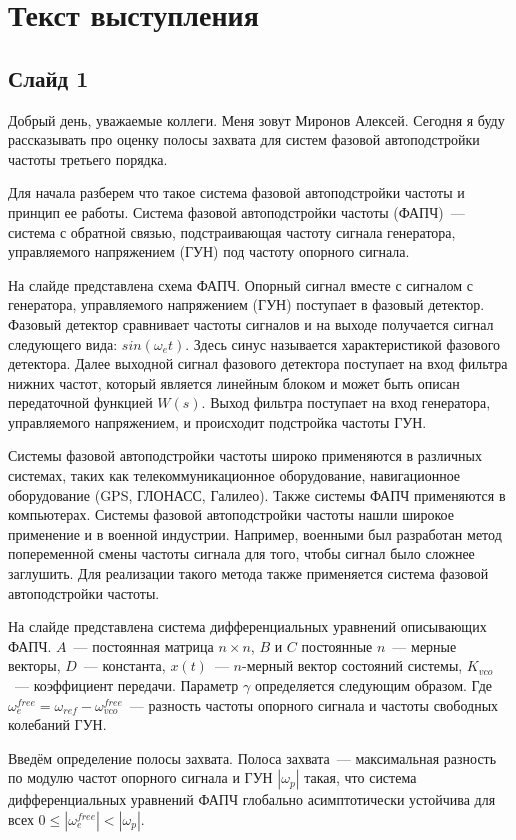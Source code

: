 \documentclass[a4paper,article,14pt]{extarticle}
\begin{document}
\section*{Текст выступления}
\subsection*{Слайд 1}
  Добрый день, уважаемые коллеги. Меня зовут Миронов Алексей. Сегодня я буду рассказывать про оценку полосы захвата для систем фазовой автоподстройки частоты третьего порядка. 

  Для начала разберем что такое система фазовой автоподстройки частоты и принцип ее работы. Система фазовой автоподстройки частоты (ФАПЧ)~--- система с обратной связью, подстраивающая частоту сигнала генератора, управляемого напряжением (ГУН) под частоту опорного сигнала.
  
На слайде представлена схема ФАПЧ. Опорный сигнал вместе с сигналом с генератора, управляемого напряжением (ГУН) поступает в фазовый детектор. Фазовый детектор сравнивает частоты сигналов и на выходе получается сигнал следующего вида: $sin(\omega_e t)$. Здесь синус называется характеристикой фазового детектора. Далее выходной сигнал фазового детектора поступает на вход фильтра нижних частот, который является линейным блоком и может быть описан передаточной функцией $W(s)$. Выход фильтра поступает на вход генератора, управляемого напряжением, и происходит подстройка частоты ГУН. 
  
  Системы фазовой автоподстройки частоты широко применяются в различных системах, таких как телекоммуникационное оборудование, навигационное оборудование (GPS, ГЛОНАСС, Галилео). Также системы ФАПЧ применяются в компьютерах. Системы фазовой автоподстройки частоты нашли широкое применение и в военной индустрии. Например, военными был разработан метод попеременной смены частоты сигнала для того, чтобы сигнал было сложнее заглушить. Для реализации такого метода также применяется система фазовой автоподстройки частоты.
    
На слайде представлена система дифференциальных уравнений описывающих ФАПЧ. $A$~--- постоянная матрица $n \times n$, $B$ и $C$ постоянные $n$~--- мерные векторы, $D$~--- константа, $x(t)$~--- $n$-мерный вектор состояний системы, $K_{vco}$~--- коэффициент передачи. Параметр $\gamma$ определяется следующим образом. Где $\omega^{free}_{e}=\omega_{ref}-\omega_{vco}^{free}$~--- разность частоты опорного сигнала и частоты свободных колебаний ГУН.
    
    Введём определение полосы захвата. Полоса захвата~--- максимальная разность по модулю частот опорного сигнала и ГУН $|\omega_p|$ такая, что система дифференциальных уравнений ФАПЧ глобально асимптотически устойчива для всех $0 \leqslant |\omega_e^{free}|<|\omega_p|$. 
    
\end{document}
